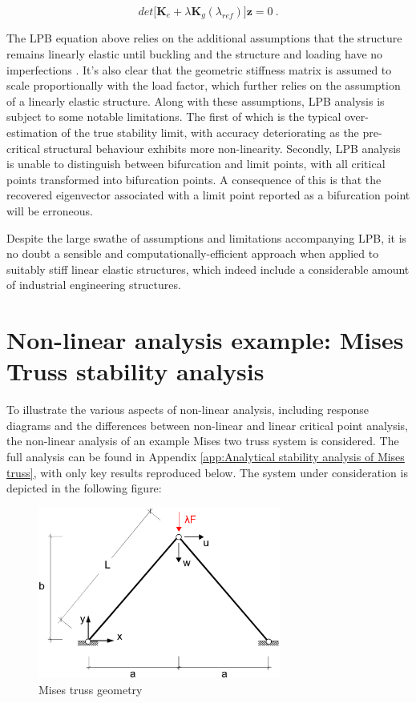  \begin{equation} 
 det\big[
 \mathbf{K}_e +
{\lambda}
 \mathbf{K}_g(\lambda_{ref})
 \big]\mathbf{z} = 0
 \label{eqstab5}\ .
 \end{equation}
 
 The LPB equation above relies on the additional assumptions that the structure remains linearly elastic until buckling and the structure and loading have no imperfections \cite{FelippaStabilityBasics2016}. It's also clear that the geometric stiffness matrix is assumed to scale proportionally with the load factor, which further relies on the assumption of a linearly elastic structure. Along with these assumptions, LPB analysis is subject to some notable limitations. The first of which is the typical over-estimation of the true stability limit, with accuracy deteriorating as the pre-critical structural behaviour exhibits more non-linearity. Secondly, LPB analysis is unable to distinguish between bifurcation and limit points, with all critical points transformed into bifurcation points. A consequence of this is that the recovered eigenvector associated with a limit point reported as a bifurcation point will be erroneous.
 
 Despite the large swathe of assumptions and limitations accompanying LPB, it is no doubt a sensible and computationally-efficient approach when applied to suitably stiff linear elastic structures, which indeed include a considerable amount of industrial engineering structures.

\section{Non-linear analysis example: Mises Truss stability analysis}

To illustrate the various aspects of non-linear analysis, including response diagrams and the differences between non-linear and linear critical point analysis, the non-linear analysis of an example Mises two truss system is considered. The full analysis can be found in Appendix \ref{app:Analytical stability analysis of Mises truss}, with only key results reproduced below. The system under consideration is depicted in the following figure:

\begin{figure}[H]
	\centering
	\def\svgwidth{\columnwidth}
	\includegraphics[width=8cm]{images/mises_truss_def.png}
	\caption{Mises truss geometry}
	\label{stab2_1}
\end{figure}

